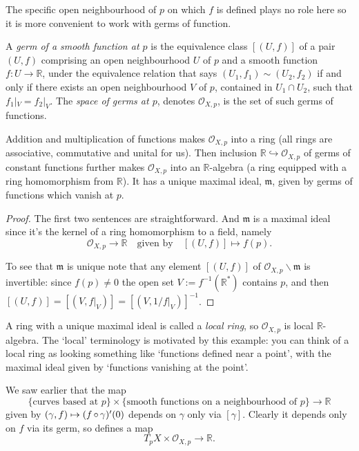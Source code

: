\documentclass[a4paper,11pt]{article}
\begin{document}
	The specific open neighbourhood of $p$ on which $f$ is defined plays no role here so it is more convenient to work with germs of function.

	\begin{defi}
		A \emph{germ of a smooth function at $p$} is the equivalence class $[(U,f)]$ of a pair $(U,f)$ comprising an open neighbourhood $U$ of $p$ and a smooth function $f: U \to \mathbb{R}$, under the equivalence relation that says $(U_1,f_1)\sim (U_2, f_2)$ if and only if there exists an open neighbourhood $V$ of $p$, contained in $U_1 \cap U_2$, such that $f_1 |_V = f_2|_V$. The \emph{space of germs at $p$}, denotes $\mathcal{O}_{X,p}$, is the set of such germs of functions. 
	\end{defi}


	\begin{lem}
		Addition and multiplication of functions makes $\mathcal{O}_{X,p}$ into a ring (all rings are associative, commutative and unital for us). Then inclusion $\mathbb{R} \hookrightarrow \mathcal{O}_{X,p}$ of germs of constant functions further makes $\mathcal{O}_{X,p}$ into an $\mathbb{R}$-algebra (a ring equipped with a ring homomorphism from $\mathbb{R}$). It has a unique maximal ideal, $\mathfrak{m}$, given by germs of functions which vanish at $p$.
	\end{lem}

	\begin{proof}
		The first two sentences are straightforward. And $\mathfrak{m}$ is a maximal ideal since it's the kernel of a ring homomorphism to a field, namely
		\[
			\mathcal{O}_{X,p} \to \mathbb{R} \quad \text{given by} \quad [(U,f)] \mapsto f(p).
		\]
		
		To see that $\mathfrak{m}$ is unique note that any element $[(U,f)]$ of $\mathcal{O}_{X,p} \backslash \mathfrak{m}$ is invertible: since $f(p) \neq 0$ the open set $V := f^{-1}(\mathbb{R}^*)$ contains $p$, and then $[(U,f)] = [(V,f|_V)] = [(V, 1/f|_V)]^{-1}$.
	\end{proof}

	A ring with a unique maximal ideal is called a \emph{local ring}, so $\mathcal{O}_{X,p}$ is local $\mathbb{R}$-algebra. The `local' terminology is motivated by this example: you can think of a local ring as looking something like `functions defined near a point', with the maximal ideal given by `functions vanishing at the point'.

	We saw earlier that the map
	\[
		\{\text{curves based at $p$}\} \times \{\text{smooth functions on a neighbourhood of $p$}\} \to \mathbb{R}
	\]
	given by $(\gamma,f) \mapsto (f \operatorname{\circ} \gamma)' (0)$ depends on $\gamma$ only via $[\gamma]$. Clearly it depends only on $f$ via its germ, so defines a map
	\[
		T_p X \times \mathcal{O}_{X,p} \to \mathbb{R}.
	\]
	
\end{document}
